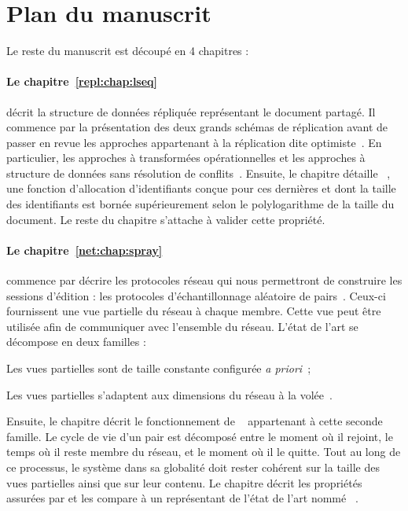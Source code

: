 
\section{Plan du manuscrit}

Le reste du manuscrit est découpé en 4 chapitres :

\paragraph{Le chapitre~\ref{repl:chap:lseq}} décrit la structure de données
répliquée représentant le document partagé. Il commence par la présentation des
deux grands schémas de réplication avant de passer en revue les approches
appartenant à la réplication dite optimiste~\cite{demers1987epidemic,
  saito2005optimistic}. En particulier, les approches à transformées
opérationnelles et les approches à structure de données sans résolution de
conflits~\cite{burckhardt2014replicated, shapiro2011conflict}. Ensuite, le
chapitre détaille \LSEQ~\cite{nedelec2013concurrency, nedelec2013lseq}, une
fonction d'allocation d'identifiants conçue pour ces dernières et dont la taille
des identifiants est bornée supérieurement selon le polylogarithme de la taille
du document. Le reste du chapitre s'attache à valider cette propriété.

\paragraph{Le chapitre~\ref{net:chap:spray}} commence par décrire les protocoles
réseau qui nous permettront de construire les sessions d'édition : les
protocoles d'échantillonnage aléatoire de pairs~\cite{jelasity2004peer,
  jelasity2007gossip}. Ceux-ci fournissent une vue partielle du réseau à chaque
membre. Cette vue peut être utilisée afin de communiquer avec l'ensemble du
réseau. L'état de l'art se décompose en deux familles :
\begin{inparaenum}[(i)]
\item Les vues partielles sont de taille constante configurée \emph{a
    priori}~\cite{eugster2003lightweight, jelasity2007gossip,
    leitao2007dependable, tolgyeski2009adaptive, voulgaris2005cyclon};
\item Les vues partielles s'adaptent aux dimensions du réseau à la
  volée~\cite{ganesh2001scamp, ganesh2003peer}.
\end{inparaenum}
Ensuite, le chapitre décrit le fonctionnement de \SPRAY~\cite{nedelec2015spray}
appartenant à cette seconde famille. Le cycle de vie d'un pair est décomposé
entre le moment où il rejoint, le temps où il reste membre du réseau, et le
moment où il le quitte. Tout au long de ce processus, le système dans sa
globalité doit rester cohérent sur la taille des vues partielles ainsi que sur
leur contenu.  Le chapitre décrit les propriétés assurées par \SPRAY et les
compare à un représentant de l'état de l'art nommé
\CYCLON~\cite{voulgaris2005cyclon}.

